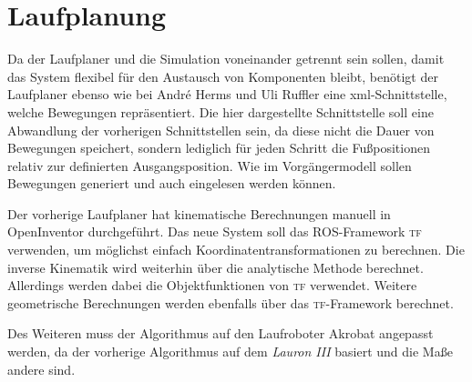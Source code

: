 \section{Laufplanung}

Da der Laufplaner und die Simulation voneinander getrennt sein sollen, damit das System flexibel für den Austausch von Komponenten bleibt, benötigt der Laufplaner ebenso wie bei André Herms und Uli Ruffler eine xml-Schnittstelle, welche Bewegungen repräsentiert. Die hier dargestellte Schnittstelle soll eine Abwandlung der vorherigen Schnittstellen sein, da diese nicht die Dauer von Bewegungen speichert, sondern lediglich für jeden Schritt die Fußpositionen relativ zur definierten Ausgangsposition. Wie im Vorgängermodell sollen Bewegungen generiert und auch eingelesen werden können.

Der vorherige Laufplaner hat kinematische Berechnungen manuell in OpenInventor durchgeführt. Das neue System soll das \ac{ROS}-Framework \textsc{tf} verwenden, um möglichst einfach Koordinatentransformationen zu berechnen. Die inverse Kinematik wird weiterhin über die analytische Methode berechnet. Allerdings werden dabei die Objektfunktionen von \textsc{tf} verwendet. Weitere geometrische Berechnungen werden ebenfalls über das \textsc{tf}-Framework berechnet.

Des Weiteren muss der Algorithmus auf den Laufroboter Akrobat angepasst werden, da der vorherige Algorithmus auf dem \emph{Lauron III} basiert und die Maße andere sind.